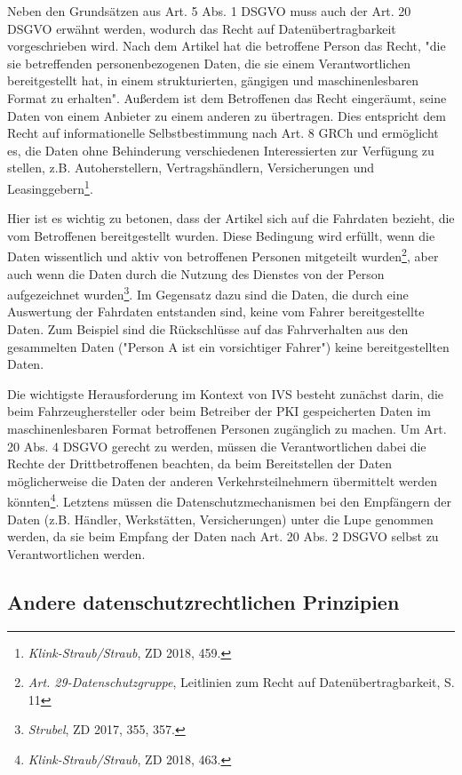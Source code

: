 Neben den Grundsätzen aus Art. 5 Abs. 1 DSGVO muss auch der Art. 20 DSGVO erwähnt werden, wodurch das Recht auf Datenübertragbarkeit vorgeschrieben wird. Nach dem Artikel hat die betroffene Person das Recht, "die sie betreffenden personenbezogenen Daten, die sie einem Verantwortlichen bereitgestellt hat, in einem strukturierten, gängigen und maschinenlesbaren Format zu erhalten". Außerdem ist dem Betroffenen das Recht eingeräumt, seine Daten von einem Anbieter zu einem anderen zu übertragen. Dies entspricht dem Recht auf informationelle Selbstbestimmung nach Art. 8 GRCh und ermöglicht es, die Daten ohne Behinderung verschiedenen Interessierten zur Verfügung zu stellen, z.B. Autoherstellern, Vertragshändlern, Versicherungen und Leasinggebern\footnote{\emph{Klink-Straub/Straub}, ZD 2018, 459.}. \nocite{Straub2018}

Hier ist es wichtig zu betonen, dass der Artikel sich auf die Fahrdaten bezieht, die vom Betroffenen bereitgestellt wurden. Diese Bedingung wird erfüllt, wenn die Daten wissentlich und aktiv von betroffenen Personen mitgeteilt wurden\footnote{\emph{Art. 29-Datenschutzgruppe}, Leitlinien zum Recht auf Datenübertragbarkeit, S. 11}, aber auch wenn die Daten durch die Nutzung des Dienstes von der Person aufgezeichnet wurden\footnote{\emph{Strubel}, ZD 2017, 355, 357.}\nocite{Strubel2017}. Im Gegensatz dazu sind die Daten, die durch eine Auswertung der Fahrdaten entstanden sind, keine vom Fahrer bereitgestellte Daten. Zum Beispiel sind die Rückschlüsse auf das Fahrverhalten aus den gesammelten Daten ("Person A ist ein vorsichtiger Fahrer") keine bereitgestellten Daten. 

Die wichtigste Herausforderung im Kontext von IVS besteht zunächst darin, die beim Fahrzeughersteller oder beim Betreiber der PKI gespeicherten Daten im maschinenlesbaren Format betroffenen Personen zugänglich zu machen. Um Art. 20 Abs. 4 DSGVO gerecht zu werden, müssen die Verantwortlichen dabei die Rechte der Drittbetroffenen beachten, da beim Bereitstellen der Daten möglicherweise die Daten der anderen Verkehrsteilnehmern übermittelt werden könnten\footnote{\emph{Klink-Straub/Straub}, ZD 2018, 463.}. Letztens müssen die Datenschutzmechanismen bei den Empfängern der Daten (z.B. Händler, Werkstätten, Versicherungen) unter die Lupe genommen werden, da sie beim Empfang der Daten nach Art. 20 Abs. 2 DSGVO selbst zu Verantwortlichen werden.

\subsection{Andere datenschutzrechtlichen Prinzipien}

